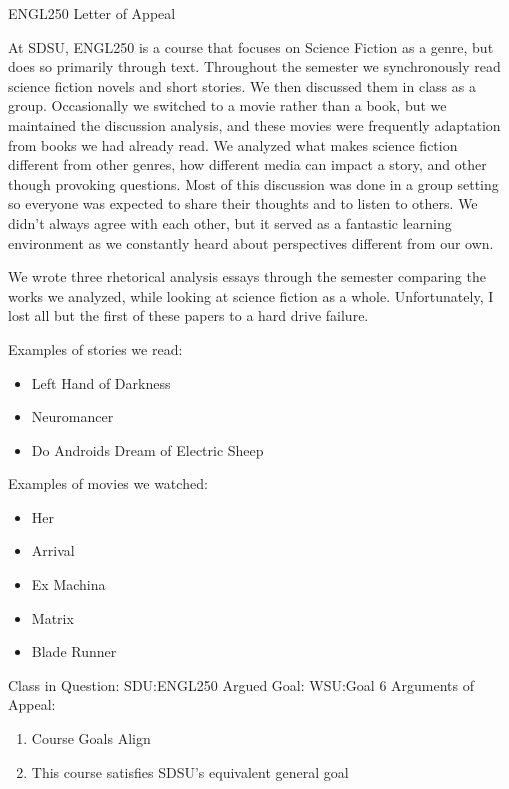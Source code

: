 \documentclass{article}
\begin{document}
\begin{center}
	ENGL250 Letter of Appeal
\end{center}

At SDSU, ENGL250 is a course that focuses on Science Fiction as a genre, but does so primarily through text. Throughout the semester we synchronously read science fiction novels and short stories. We then discussed them in class as a group. Occasionally we switched to a movie rather than a book, but we maintained the discussion analysis, and these movies were frequently adaptation from books we had already read. We analyzed what makes science fiction different from other genres, how different media can impact a story, and other though provoking questions. Most of this discussion was done in a group setting so everyone was expected to share their thoughts and to listen to others. We didn't always agree with each other, but it served as a fantastic learning environment as we constantly heard about perspectives different from our own.

We wrote three rhetorical analysis essays through the semester comparing the works we analyzed, while looking at science fiction as a whole. Unfortunately, I lost all but the first of these papers to a hard drive failure.

Examples of stories we read:
\begin{itemize}
	\item Left Hand of Darkness
	\item Neuromancer
	\item Do Androids Dream of Electric Sheep
\end{itemize}
Examples of movies we watched:
\begin{itemize}
	\item Her
	\item Arrival
	\item Ex Machina
	\item Matrix
	\item Blade Runner
\end{itemize}
Class in Question: SDU:ENGL250
\newline
Argued Goal: WSU:Goal 6
\newline
Arguments of Appeal:
\begin{enumerate}
	\item Course Goals Align
	\item This course satisfies SDSU's equivalent general goal
\end{enumerate}

\end{document}
